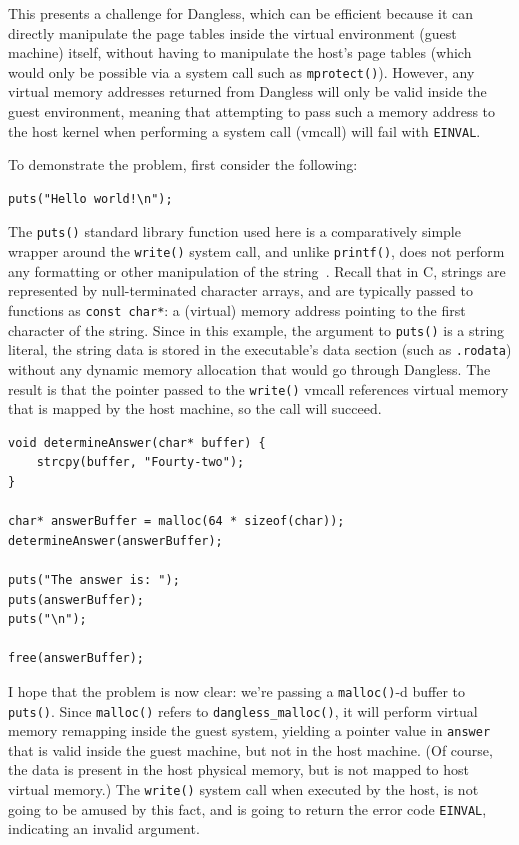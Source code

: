 This presents a challenge for Dangless, which can be efficient because it can directly manipulate the page tables inside the virtual environment (guest machine) itself, without having to manipulate the host's page tables (which would only be possible via a system call such as \lstinline!mprotect()!). However, any virtual memory addresses returned from Dangless will only be valid inside the guest environment, meaning that attempting to pass such a memory address to the host kernel when performing a system call (vmcall) will fail with \lstinline!EINVAL!.

To demonstrate the problem, first consider the following:

\begin{lstlisting}
puts("Hello world!\n");
\end{lstlisting}

The \lstinline!puts()! standard library function used here is a comparatively simple wrapper around the \lstinline!write()! system call, and unlike \lstinline!printf()!, does not perform any formatting or other manipulation of the string~\cite{glibc-puts-analysis}. Recall that in C, strings are represented by null-terminated character arrays, and are typically passed to functions as \lstinline!const char*!: a (virtual) memory address pointing to the first character of the string. Since in this example, the argument to \lstinline!puts()! is a string literal, the string data is stored in the executable's data section (such as \texttt{.rodata}) without any dynamic memory allocation that would go through Dangless. The result is that the pointer passed to the \lstinline!write()! vmcall references virtual memory that is mapped by the host machine, so the call will succeed.

\begin{lstlisting}
void determineAnswer(char* buffer) {
	strcpy(buffer, "Fourty-two");
}

char* answerBuffer = malloc(64 * sizeof(char));
determineAnswer(answerBuffer);

puts("The answer is: ");
puts(answerBuffer);
puts("\n");

free(answerBuffer);
\end{lstlisting}

I hope that the problem is now clear: we're passing a \lstinline!malloc()!-d buffer to \lstinline!puts()!. Since \lstinline!malloc()! refers to \lstinline!dangless_malloc()!, it will perform virtual memory remapping inside the guest system, yielding a pointer value in \lstinline!answer! that is valid inside the guest machine, but not in the host machine. (Of course, the data is present in the host physical memory, but is not mapped to host virtual memory.) The \lstinline!write()! system call when executed by the host, is not going to be amused by this fact, and is going to return the error code \texttt{EINVAL}, indicating an invalid argument.

